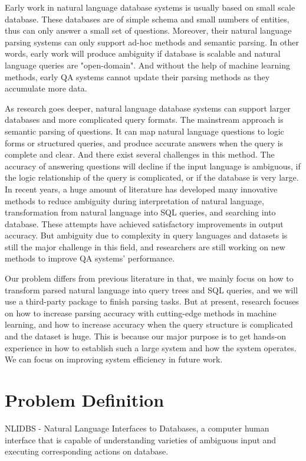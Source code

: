 \documentclass[twocolumn]{article}
\begin{document}
Early work in natural language database systems is usually based on small scale database. These databases are of simple schema and small numbers of entities, thus can only answer a small set of questions. Moreover, their natural language parsing systems can only support ad-hoc methods and semantic parsing. In other words, early work will produce ambiguity if database is scalable and natural language queries are "open-domain". And without the help of machine learning methods, early QA systems cannot update their parsing methods as they accumulate more data.
      
As research goes deeper, natural language database systems can support larger databases and more complicated query formats. The mainstream approach is semantic parsing of questions. It can map natural language questions to logic forms or structured queries, and produce accurate answers when the query is complete and clear. And there exist several challenges in this method. The accuracy of answering questions will decline if the input language is ambiguous, if the logic relationship of the query is complicated, or if the database is very large. In recent years, a huge amount of literature has developed many innovative methods to reduce ambiguity during interpretation of natural language, transformation from natural language into SQL queries, and searching into database. These attempts have achieved satisfactory improvements in output accuracy. But ambiguity due to complexity in query languages and datasets is still the major challenge in this field, and researchers are still working on new methods to improve QA systems' performance.
      
Our problem differs from previous literature in that, we mainly focus on how to transform parsed natural language into query trees and SQL queries, and we will use a third-party package to finish parsing tasks. But at present, research focuses on how to increase parsing accuracy with cutting-edge methods in machine learning, and how to increase accuracy when the query structure is complicated and the dataset is huge. This is because our major purpose is to get hands-on experience in how to establish such a large system and how the system operates. We can focus on improving system efficiency in future work.


\section{Problem Definition}
NLIDBS - Natural Language Interfaces to Databases, a computer human interface that is capable of understanding varieties of ambiguous input and executing corresponding actions on database.
      
\end{document}
